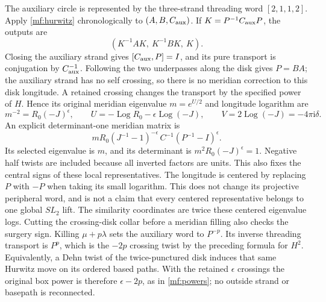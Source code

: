 \documentclass[11pt]{article}
\numberwithin{equation}{section}
\theoremstyle{definition}
\theoremstyle{remark}
\newcommand{\ii}{\mathrm i}
\newcommand{\Log}{\operatorname{Log}}
\begin{document}
The auxiliary circle is represented by the three-strand threading word
\([2,1,1,2]\). Apply \eqref{mf:hurwitz} chronologically to
\((A,B,C_{\rm aux})\). If \(K=P^{-1}C_{\rm aux}P\), the outputs are
\[
                  (K^{-1}AK,\ K^{-1}BK,\ K).
\]
Closing the auxiliary strand gives \([C_{\rm aux},P]=I\), and its
pure transport is conjugation by \(C_{\rm aux}^{-1}\). Following the
two underpasses along the disk gives \(P=BA\); the auxiliary strand
has no self crossing, so there is no meridian correction to this
disk longitude. A retained crossing changes the transport by the
specified power of \(H\). Hence its original meridian eigenvalue
\(m=e^{U/2}\) and longitude logarithm are
\begin{equation}\label{mf:peripheral}
 m^{-2}=R_0(-J)^\epsilon,\qquad
 U=-\Log R_0-\epsilon\Log(-J),\qquad
                         V=2\Log(-J)=-4\pi\ii\delta .
\end{equation}
An explicit determinant-one meridian matrix is
\begin{equation}\label{mf:meridian-matrix}
 mR_0(J^{-1}-1)^{-\epsilon}\,
                       C^{-1}(P^{-1}-I)^\epsilon.
\end{equation}
Its selected eigenvalue is \(m\), and its determinant is
\(m^2R_0(-J)^\epsilon=1\). Negative half twists are included because
all inverted factors are units. This also fixes the central signs of
these local representatives. The longitude is centered by replacing
\(P\) with \(-P\) when taking its small logarithm. This does not change
its projective peripheral word, and is not a claim that every centered
representative belongs to one global \(SL_2\) lift. The similarity
coordinates are twice these centered eigenvalue logs.
Cutting the crossing-disk collar before a meridian filling also checks
the surgery sign. Killing \(\mu+p\lambda\) sets the auxiliary word
to \(P^{-p}\). Its inverse threading transport is \(P^p\), which is
the \(-2p\) crossing twist by the preceding formula for \(H^2\).
Equivalently, a Dehn twist of the twice-punctured disk induces that
same Hurwitz move on its ordered based paths. With the retained
\(\epsilon\) crossings the original box power is therefore
\(\epsilon-2p\), as in \eqref{mf:powers}; no outside strand or
basepath is reconnected.
\end{document}
